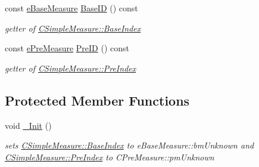\begin{DoxyCompactItemize}
const \hyperlink{BaseMeasure_8h_ac90e5164ccf1f0d648fba7e94b229a11}{e\+Base\+Measure} \hyperlink{classCSimpleMeasure_a8b523b4264aed1ccae15fd39cc7e31f4}{Base\+ID} () const
\begin{DoxyCompactList}\small\item\em getter of \hyperlink{classCSimpleMeasure_a191dbfa4cc374946bf8a82111f827d92}{C\+Simple\+Measure\+::\+Base\+Index} \end{DoxyCompactList}\item 
const \hyperlink{PreMeasure_8h_a6c81167b8d4c2badde42f81cb7214620}{e\+Pre\+Measure} \hyperlink{classCSimpleMeasure_ae2704585c95b6a165e982186afef5556}{Pre\+ID} () const
\begin{DoxyCompactList}\small\item\em getter of \hyperlink{classCSimpleMeasure_aa23ed9eec21adb9a97c90a424e7ee18a}{C\+Simple\+Measure\+::\+Pre\+Index} \end{DoxyCompactList}\end{DoxyCompactItemize}
\subsection*{Protected Member Functions}
\begin{DoxyCompactItemize}
\item 
void \hyperlink{classCSimpleMeasure_ada8744ac5a824143904a2ecaef2b0b70}{\+\_\+\+Init} ()
\begin{DoxyCompactList}\small\item\em sets \hyperlink{classCSimpleMeasure_a191dbfa4cc374946bf8a82111f827d92}{C\+Simple\+Measure\+::\+Base\+Index} to e\+Base\+Measure\+::bm\+Unknown and \hyperlink{classCSimpleMeasure_aa23ed9eec21adb9a97c90a424e7ee18a}{C\+Simple\+Measure\+::\+Pre\+Index} to C\+Pre\+Measure\+::pm\+Unknown \end{DoxyCompactList}\end{DoxyCompactItemize}
